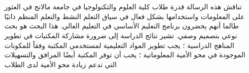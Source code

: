\setarab
\chapter*{\centering\Large{}}%
\thispagestyle{empty}%
\begin{RLtext}
تناقش هذه الرسالة قدرة طلاب كلية العلوم والتكنولوجيا في جامعة مالانج في العثور على المعلومات واستخدامها بشكل فعال في سياق التعلم النشط والتعلم المنظم ذاتيًا طالما أنهم يحضرون برنامج التعليم الأساسي في التعليم العالي. هذا البحث هو بحث نوعي بتصميم وصفي.
تشير نتائج الدراسة إلى ضرورة مشاركة المكتبات في تطوير المناهج الدراسية ؛ يجب تطوير المواد التعليمية لمستخدمي المكتبة وفقاً للمكونات الموجودة في محو الأمية المعلوماتية ؛ يجب أن توفر المكتبة أيضًا المرافق والتسهيلات التي تدعم زيادة محو الأمية لدى الطلاب
\end{RLtext}